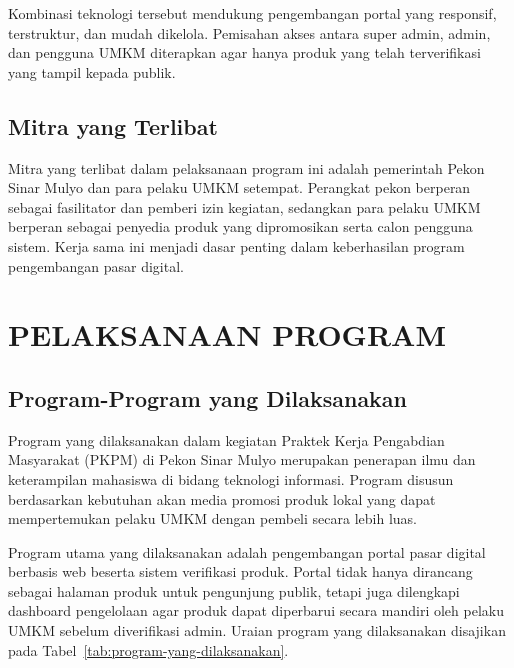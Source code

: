\documentclass[12pt,a4paper]{article}
\begin{document}
Kombinasi teknologi tersebut mendukung pengembangan portal yang
responsif, terstruktur, dan mudah dikelola. Pemisahan akses antara
super admin, admin, dan pengguna UMKM diterapkan agar hanya produk
yang telah terverifikasi yang tampil kepada publik.


\subsection{Mitra yang Terlibat}

Mitra yang terlibat dalam pelaksanaan program ini adalah pemerintah
Pekon Sinar Mulyo dan para pelaku UMKM setempat. Perangkat pekon
berperan sebagai fasilitator dan pemberi izin kegiatan, sedangkan
para pelaku UMKM berperan sebagai penyedia produk yang dipromosikan
serta calon pengguna sistem. Kerja sama ini menjadi dasar penting
dalam keberhasilan program pengembangan pasar digital.

\clearpage

\section{PELAKSANAAN PROGRAM}

\subsection{Program-Program yang Dilaksanakan}

Program yang dilaksanakan dalam kegiatan Praktek Kerja Pengabdian
Masyarakat (PKPM) di Pekon Sinar Mulyo merupakan penerapan ilmu dan
keterampilan mahasiswa di bidang teknologi informasi. Program
disusun berdasarkan kebutuhan akan media promosi produk lokal yang
dapat mempertemukan pelaku UMKM dengan pembeli secara lebih luas.

Program utama yang dilaksanakan adalah pengembangan portal pasar
digital berbasis web beserta sistem verifikasi produk. Portal tidak
hanya dirancang sebagai halaman produk untuk pengunjung publik,
tetapi juga dilengkapi dashboard pengelolaan agar produk dapat
diperbarui secara mandiri oleh pelaku UMKM sebelum diverifikasi
admin. Uraian program yang dilaksanakan disajikan pada
Tabel~\ref{tab:program-yang-dilaksanakan}.

\end{document}
